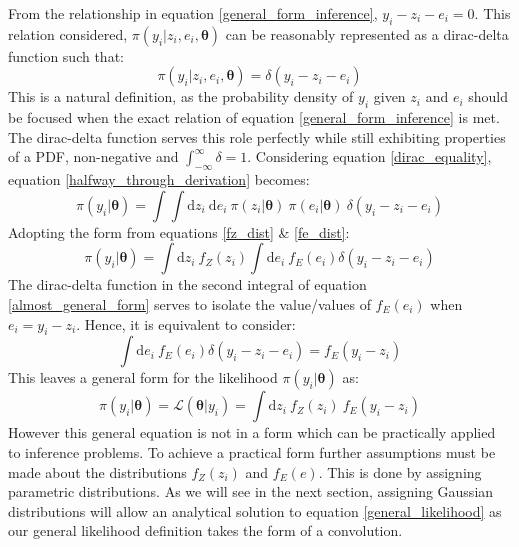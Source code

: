 From the relationship in equation \ref{general_form_inference}, $y_i-z_i-e_i = 0$. This relation considered, $\pi(y_i|z_i,e_i,\bm{\theta})$ can be reasonably represented as a dirac-delta function such that:
\begin{equation}
\pi(y_i|z_i,e_i,\bm{\theta}) = \delta(y_i-z_i-e_i)
\label{dirac_equality}
\end{equation}
This is a natural definition, as the probability density of $y_i$ given $z_i$ and $e_i$ should be focused when the exact relation of equation \ref{general_form_inference} is met. The dirac-delta function serves this role perfectly while still exhibiting properties of a PDF, non-negative and $\int_{-\infty}^{\infty}\delta = 1$. Considering equation \ref{dirac_equality}, equation \ref{halfway_through_derivation} becomes:
\begin{equation}
\pi(y_i|\bm{\theta}) = \int \int \text{d}z_i\ \text{d}e_i\ \pi(z_i|\bm{\theta})\ \pi(e_i|\bm{\theta})\ \delta(y_i-z_i-e_i)
\end{equation}
Adopting the form from equations \ref{fz_dist} \& \ref{fe_dist}:
\begin{equation}
\pi(y_i|\bm{\theta}) = \int \text{d}z_i\ f_Z(z_i) \int \text{d}e_i\ f_E(e_i) \delta(y_i-z_i-e_i)
\label{almost_general_form}
\end{equation}
The dirac-delta function in the second integral of equation \ref{almost_general_form} serves to isolate the value/values of $f_E(e_i)$ when $e_i = y_i - z_i$. Hence, it is equivalent to consider:
\begin{equation}
\int \text{d}e_i\ f_E(e_i) \delta(y_i-z_i-e_i) = f_E(y_i - z_i)
\end{equation}
This leaves a general form for the likelihood $\pi(y_i|\bm{\theta})$ as: 
\begin{equation}
\pi(y_i|\bm{\theta}) = \mathcal{L}(\bm{\theta}|y_i) = \int \text{d}z_i\ f_Z(z_i)\ f_E(y_i - z_i)
\label{general_likelihood}
\end{equation}
However this general equation is not in a form which can be practically applied to inference problems. To achieve a practical form further assumptions must be made about the distributions $f_Z(z_i)$ and $f_E(e)$. This is done by assigning parametric distributions. As we will see in the next section, assigning Gaussian distributions will allow an analytical solution to equation \ref{general_likelihood} as our general likelihood definition takes the form of a convolution. 

